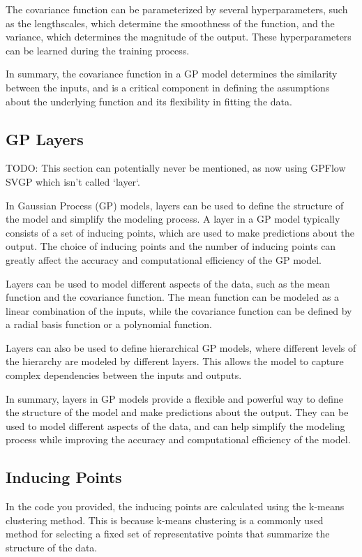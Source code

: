 \documentclass[12pt,a4paper]{report}
\begin{document}
The covariance function can be parameterized by several hyperparameters, such as the lengthscales, which determine the smoothness of the function, and the variance, which determines the magnitude of the output. 
These hyperparameters can be learned during the training process.

In summary, the covariance function in a GP model determines the similarity between the inputs, and is a critical component in defining the assumptions about the underlying function and its flexibility in fitting the data.

\subsection{GP Layers}

TODO: This section can potentially never be mentioned, as now using GPFlow SVGP which isn't called `layer`.

In Gaussian Process (GP) models, layers can be used to define the structure of the model and simplify the modeling process. 
A layer in a GP model typically consists of a set of inducing points, which are used to make predictions about the output. 
The choice of inducing points and the number of inducing points can greatly affect the accuracy and computational efficiency of the GP model.

Layers can be used to model different aspects of the data, such as the mean function and the covariance function. 
The mean function can be modeled as a linear combination of the inputs, while the covariance function can be defined by a radial basis function or a polynomial function.

Layers can also be used to define hierarchical GP models, where different levels of the hierarchy are modeled by different layers. 
This allows the model to capture complex dependencies between the inputs and outputs.

In summary, layers in GP models provide a flexible and powerful way to define the structure of the model and make predictions about the output. 
They can be used to model different aspects of the data, and can help simplify the modeling process while improving the accuracy and computational efficiency of the model.

\subsection{Inducing Points}

In the code you provided, the inducing points are calculated using the k-means clustering method. 
This is because k-means clustering is a commonly used method for selecting a fixed set of representative points that summarize the structure of the data.
\end{document}
